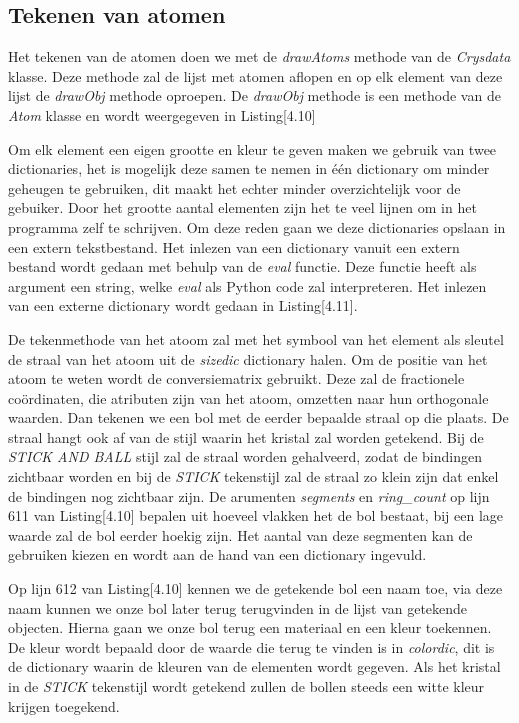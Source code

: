 \subsection{Tekenen van atomen}

Het tekenen van de atomen doen we met de \textit{drawAtoms} methode van de \textit{Crysdata} klasse. Deze methode zal de lijst met atomen aflopen en op elk element van deze lijst de \textit{drawObj} methode oproepen. De \textit{drawObj} methode is een methode van de \textit{Atom} klasse en wordt weergegeven in Listing[4.10] 



Om elk element een eigen grootte en kleur te geven maken we gebruik van twee dictionaries, het is mogelijk deze samen te nemen in één dictionary om minder geheugen te gebruiken, dit maakt het echter minder overzichtelijk voor de gebuiker. Door het grootte aantal elementen zijn het te veel lijnen om in het programma zelf te schrijven. Om deze reden gaan we deze dictionaries opslaan in een extern tekstbestand. Het inlezen van een dictionary vanuit een extern bestand wordt gedaan met behulp van de \textit{eval} functie. Deze functie heeft als argument een string, welke \textit{eval} als Python code zal interpreteren. Het inlezen van een externe dictionary wordt gedaan in Listing[4.11]. 
  


De tekenmethode van het atoom zal met het symbool van het element als sleutel de straal van het atoom uit de \textit{sizedic} dictionary halen. Om de positie van het atoom te weten wordt de conversiematrix gebruikt. Deze zal de fractionele coördinaten, die atributen zijn van het atoom, omzetten naar hun orthogonale waarden. Dan tekenen we een bol met de eerder bepaalde straal op die plaats. De straal hangt ook af van de stijl waarin het kristal zal worden getekend. Bij de \textit{STICK AND BALL} stijl zal de straal worden gehalveerd, zodat de bindingen zichtbaar worden en bij de \textit{STICK} tekenstijl zal de straal zo klein zijn dat enkel de bindingen nog zichtbaar zijn. De arumenten \textit{segments} en \textit{ring\_count} op lijn 611 van Listing[4.10] bepalen uit hoeveel vlakken het de bol bestaat, bij een lage waarde zal de bol eerder hoekig zijn. Het aantal van deze segmenten kan de gebruiken kiezen en wordt aan de hand van een dictionary ingevuld.
\par
Op lijn 612 van Listing[4.10] kennen we de getekende bol een naam toe, via deze naam kunnen we onze bol later terug terugvinden in de lijst van getekende objecten. Hierna gaan we onze bol terug een materiaal en een kleur toekennen. De kleur wordt bepaald door de waarde die terug te vinden is in \textit{colordic}, dit is de dictionary waarin de kleuren van de elementen wordt gegeven. Als het kristal in de \textit{STICK} tekenstijl wordt getekend zullen de bollen steeds een witte kleur krijgen toegekend.
\par

